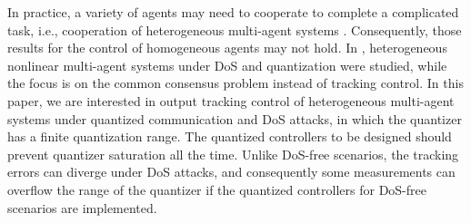\documentclass{autart}
\begin{document}
In practice, a variety of agents may need to cooperate to complete a complicated task, i.e., cooperation of heterogeneous multi-agent systems \cite{li2021cooperative, ding2019distributed}. Consequently, those results for the control of homogeneous agents may not hold. In \cite{ran2022quantized}, heterogeneous nonlinear multi-agent systems under DoS and quantization were studied, while the focus is on the common consensus problem instead of tracking control. 
In this paper, we are interested in output tracking control of heterogeneous multi-agent systems under quantized communication and DoS attacks, in which the quantizer has a finite quantization range. 
The quantized controllers to be designed should prevent quantizer saturation all the time. Unlike DoS-free scenarios, the tracking errors can diverge under DoS attacks, and consequently some measurements can overflow the range of the quantizer if the quantized controllers for DoS-free scenarios are implemented. 







\end{document}
